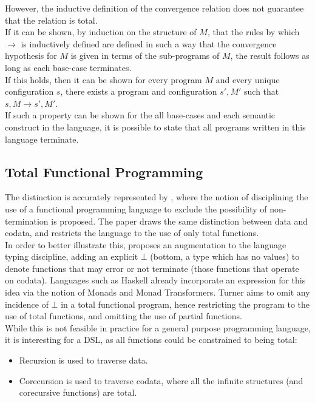 However, the inductive definition of the convergence relation does not guarantee that the relation is total.\\

If it can be shown, by induction on the structure of $M$, that the rules by which $\rightarrow$ is inductively defined are defined in such a way that the convergence hypothesis for $M$ is given in terms of the sub-programs of $M$, the result follows as long as each base-case terminates. \\

If this holds, then it can be shown for every program $M$ and every unique configuration $s$, there exists a program and configuration $s', M'$ such that $s, M \rightarrow s', M'$.\\

If such a property can be shown for the all base-cases and each semantic construct in the language, it is possible to state that all programs written in this language terminate. 


\subsection{Total Functional Programming} %
\label{sub:total_functional_programming}
The distinction is accurately represented by \citet{turner2004total}, where the notion of disciplining the use of a functional programming language to exclude the possibility of non-termination is proposed. 
The paper draws the same distinction between data and codata, and restricts the language to the use of only total functions. \\

In order to better illustrate this, \citet{turner2004total} proposes an augmentation to the language typing discipline, adding an explicit $\bot$ (bottom, a type which has no values) to denote functions that may error or not terminate (those functions that operate on codata). 
Languages such as Haskell already incorporate an expression for this idea via the notion of Monads and Monad Transformers.
Turner aims to omit any incidence of $\bot$ in a total functional program, hence restricting the program to the use of total functions, and omitting the use of partial functions. \\

While this is not feasible in practice for a general purpose programming language, it is interesting for a DSL, as all functions could be constrained to being total:
\begin{itemize}
    \item Recursion is used to traverse data.
    \item Corecursion is used to traverse codata, where all the infinite structures (and corecursive functions) are total. 
\end{itemize}

